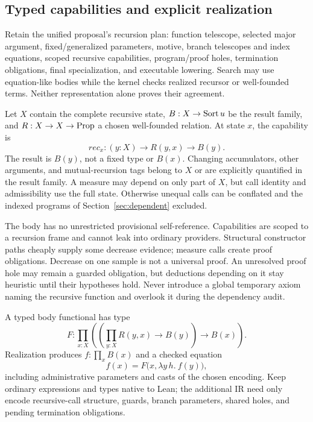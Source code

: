 \subsection{Typed capabilities and explicit realization}\label{sec:recursion-capabilities}

Retain the unified proposal's recursion plan: function telescope, selected
major argument, fixed/generalized parameters, motive, branch telescopes and
index equations, scoped recursive capabilities, program/proof holes,
termination obligations, final specialization, and executable lowering.
Search may use equation-like bodies while the kernel checks realized recursor
or well-founded terms. Neither representation alone proves their agreement.

Let $X$ contain the complete recursive state, $B:X\to\mathrm{Sort}\,u$ be the result
family, and $R:X\to X\to\mathrm{Prop}$ a chosen well-founded relation. At state $x$,
the capability is
\begin{equation}\label{eq:recursion-capability}
 \mathit{rec}_x:(y:X)\to R(y,x)\to B(y).
\end{equation}
The result is $B(y)$, not a fixed type or $B(x)$. Changing accumulators, other
arguments, and mutual-recursion tags belong to $X$ or are explicitly quantified
in the result family. A measure may depend on only part of $X$, but call
identity and admissibility use the full state. Otherwise unequal calls can be
conflated and the indexed programs of Section~\ref{sec:dependent} excluded.

The body has no unrestricted provisional self-reference. Capabilities are
scoped to a recursion frame and cannot leak into ordinary providers.
Structural constructor paths cheaply supply some decrease evidence; measure
calls create proof obligations. Decrease on one sample is not a universal
proof. An unresolved proof hole may remain a guarded obligation, but deductions
depending on it stay heuristic until their hypotheses hold. Never introduce a
global temporary axiom naming the recursive function and overlook it during
the dependency audit.

A typed body functional has type
\[
 F:\prod_{x:X}
       \left(\left(\prod_{y:X}R(y,x)\to B(y)\right)\to B(x)\right).
\]
Realization produces $f:\prod_x B(x)$ and a checked equation
\begin{equation}\label{eq:recursion-equation}
 f(x)=F\bigl(x,\lambda y\,h.\ f(y)\bigr),
\end{equation}
including administrative parameters and casts of the chosen encoding.
Keep ordinary expressions and types native to Lean; the additional IR need
only encode recursive-call structure, guards, branch parameters, shared holes,
and pending termination obligations.

